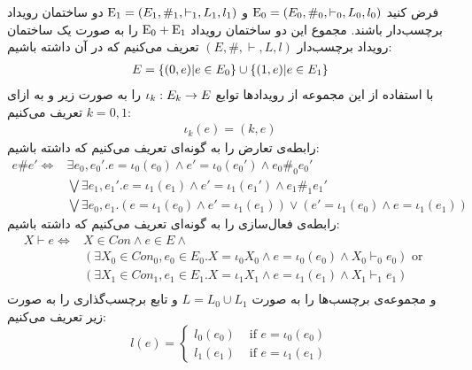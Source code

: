 \begin{definition}
    فرض کنید
    $\mathrm{E}_0 = (E_0,\#_0,\vdash_0,L_0,l_0)$
    و
    $\mathrm{E}_1 = (E_1,\#_1,\vdash_1,L_1,l_1)$
    دو ساختمان رویداد برچسب‌دار باشند.
    مجموع این دو ساختمان رویداد
    $\mathrm{E}_0 + \mathrm{E}_1$
    را به صورت یک ساختمان رویداد برچسب‌دار
    $(E,\#,\vdash,L,l)$
    تعریف می‌کنیم که در آن داشته باشیم:
    \begin{align*}
        E = \{(0,e)|e \in E_0\} \cup \{(1,e)|e \in E_1\}
    \end{align*}
    با استفاده از این مجموعه از رویداد‌ها توابع
    $\iota_k: E_k \rightarrow E$
    را به صورت زیر و به ازای
    $k=0,1$
    تعریف می‌کنیم:
    \begin{align*}
        \iota_k(e) = (k,e)
    \end{align*}
    رابطه‌ی تعارض را به گونه‌ای تعریف می‌کنیم که داشته باشیم:
    \begin{align*}
        e \# e' \iff & \exists e_0,e_0'. e = \iota_0(e_0)
        \wedge e' = \iota_0(e_0') \wedge e_0 \#_0e_0'             \\
                     & \bigvee \exists e_1,e_1'. e = \iota_1(e_1)
        \wedge e' = \iota_1(e_1') \wedge e_1 \#_1 e_1'            \\
                     & \bigvee \exists e_0,e_1.(e=\iota_1(e_0)
        \wedge e' =\iota_1(e_1)) \vee
        (e'=\iota_1(e_0) \wedge e =\iota_1(e_1))
    \end{align*}
    رابطه‌ی فعال‌سازی را به گونه‌ای تعریف می‌کنیم که داشته باشیم:
    \begin{align*}
        X \vdash e \iff & X \in Con \wedge e \in E \wedge                   & \\
                        & (\exists X_0 \in Con_0,e_0 \in E_0.X = \iota_0X_0
        \wedge e = \iota_0(e_0) \wedge X_0 \vdash_0 e_0) \text{ or }          \\
                        & (\exists X_1 \in Con_1,e_1 \in E_1.X = \iota_1X_1
        \wedge e = \iota_1(e_1) \wedge X_1 \vdash_1 e_1)                      \\
    \end{align*}
    و مجموعه‌ی برچسب‌ها را به صورت
    $L = L_0 \cup L_1$
    و تابع برچسب‌گذاری را به صورت زیر تعریف می‌کنیم:
    $$
        l(e) = \begin{cases}
            l_0(e_0) & \text{ if } e = \iota_0(e_0) \\
            l_1(e_1) & \text{ if } e = \iota_1(e_1)
        \end{cases}
    $$
\end{definition}

